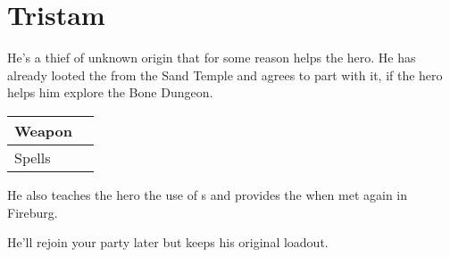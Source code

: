 \section{Tristam}
\label{char:tristam}


He’s a thief of unknown origin that for some reason helps the hero. He has already looted the  from the Sand Temple and agrees to part with it, if the hero helps him explore the Bone Dungeon.

\bigskip
\begin{tabular}{ l | l }
	Weapon & \nameref{weapon:ninja_stars} \\
	\hline
	Spells & \nameref{spell:life}
\end{tabular}
\bigskip

He also teaches the hero the use of s and provides the  when met again in Fireburg.

\vspace{1em}

He’ll rejoin your party later but keeps his original loadout. 
